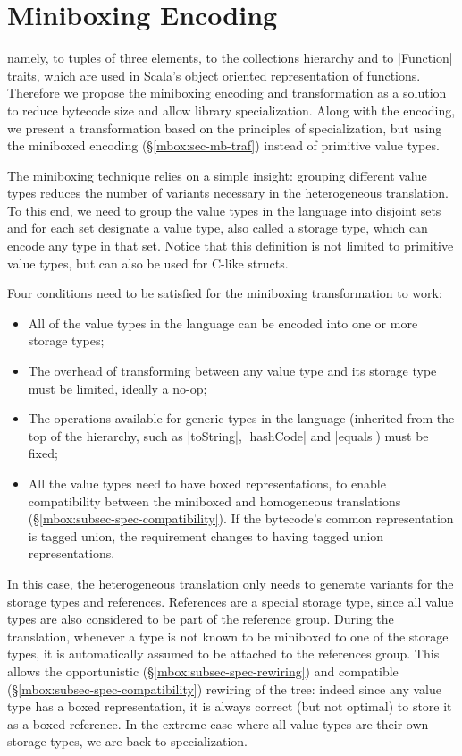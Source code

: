 \newpage
\section{Miniboxing Encoding}
\label{mbox:sec-miniboxing}

 namely, to tuples of three elements, to the collections hierarchy and to |Function| traits, which are used in Scala's object oriented representation of functions. Therefore we propose the miniboxing encoding and transformation as a solution to reduce bytecode size and allow library specialization. Along with the encoding, we present a transformation based on the principles of specialization, but using the miniboxed encoding (\S\ref{mbox:sec-mb-traf}) instead of primitive value types.

The miniboxing technique relies on a simple insight: grouping different value types reduces the number of variants necessary in the heterogeneous translation. To this end, we need to group the value types in the language into disjoint sets and for each set designate a value type, also called a storage type, which can encode any type in that set. Notice that this definition is not limited to primitive value types, but can also be used for C-like structs.

Four conditions need to be satisfied for the miniboxing transformation to work:
\begin{itemize}
  \item All of the value types in the language can be encoded into one or more storage types;
  \item The overhead of transforming between any value type and its storage type must be limited, ideally a no-op;
  \item The operations available for generic types in the language (inherited from the top of the hierarchy, such as |toString|, |hashCode| and |equals|) must be fixed;
  \item All the value types need to have boxed representations, to enable compatibility between the miniboxed and homogeneous translations (\S\ref{mbox:subsec-spec-compatibility}). If the bytecode's common representation is tagged union, the requirement changes to having tagged union representations.
\end{itemize}

In this case, the heterogeneous translation only needs to generate variants for the storage types and references. References are a special storage type, since all value types are also considered to be part of the reference group. During the translation, whenever a type is not known to be miniboxed to one of the storage types, it is automatically assumed to be attached to the references group. This allows the opportunistic (\S\ref{mbox:subsec-spec-rewiring}) and compatible (\S\ref{mbox:subsec-spec-compatibility}) rewiring of the tree: indeed since any value type has a boxed representation, it is always correct (but not optimal) to store it as a boxed reference. In the extreme case where all value types are their own storage types, we are back to specialization.

